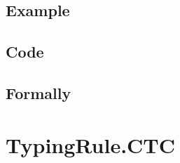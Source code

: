 \documentclass{book}
\begin{document}
  \subsection{Example}

  \subsection{Code}
        
\begin{emptyformal}
    \subsection{Formally}
\end{emptyformal}


\section{TypingRule.CTC \label{sec:TypingRule.CTC}}
\end{document}
